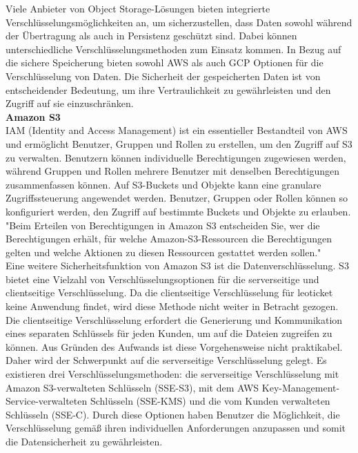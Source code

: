 Viele Anbieter von Object Storage-Lösungen bieten integrierte Verschlüsselungsmöglichkeiten an, um sicherzustellen, dass Daten sowohl während der Übertragung als auch in Persistenz geschützt sind. Dabei können unterschiedliche Verschlüsselungsmethoden zum Einsatz kommen. In Bezug auf die sichere Speicherung bieten sowohl AWS als auch GCP Optionen für die Verschlüsselung von Daten. Die Sicherheit der gespeicherten Daten ist von entscheidender Bedeutung, um ihre Vertraulichkeit zu gewährleisten und den Zugriff auf sie einzuschränken.\\

\textbf{Amazon S3}\\

IAM (Identity and Access Management) ist ein essentieller Bestandteil von AWS und ermöglicht Benutzer, Gruppen und Rollen zu erstellen, um den Zugriff auf S3 zu verwalten. Benutzern können individuelle Berechtigungen zugewiesen werden, während Gruppen und Rollen mehrere Benutzer mit denselben Berechtigungen zusammenfassen können. Auf S3-Buckets und Objekte kann eine granulare Zugriffssteuerung angewendet werden. Benutzer, Gruppen oder Rollen können so konfiguriert werden, den Zugriff auf bestimmte Buckets und Objekte zu erlauben. "Beim Erteilen von Berechtigungen in Amazon S3 entscheiden Sie, wer die Berechtigungen erhält, für welche Amazon-S3-Ressourcen die Berechtigungen gelten und welche Aktionen zu diesen Ressourcen gestattet werden sollen."\cite{aws-iam-s3}\\

Eine weitere Sicherheitsfunktion von Amazon S3 ist die Datenverschlüsselung. S3 bietet eine Vielzahl von Verschlüsselungsoptionen für die serverseitige und clientseitige Verschlüsselung. Da die clientseitige Verschlüsselung für leoticket keine Anwendung findet, wird diese Methode nicht weiter in Betracht gezogen. Die clientseitige Verschlüsselung erfordert die Generierung und Kommunikation eines separaten Schlüssels für jeden Kunden, um auf die Dateien zugreifen zu können. Aus Gründen des Aufwands ist diese Vorgehensweise nicht praktikabel. Daher wird der Schwerpunkt auf die serverseitige Verschlüsselung gelegt. Es existieren drei Verschlüsselungsmethoden: die serverseitige Verschlüsselung mit Amazon S3-verwalteten Schlüsseln (SSE-S3), mit dem AWS Key-Management-Service-verwalteten Schlüsseln (SSE-KMS) und die vom Kunden verwalteten Schlüsseln (SSE-C). Durch diese Optionen haben Benutzer die Möglichkeit, die Verschlüsselung gemäß ihren individuellen Anforderungen anzupassen und somit die Datensicherheit zu gewährleisten.\\

